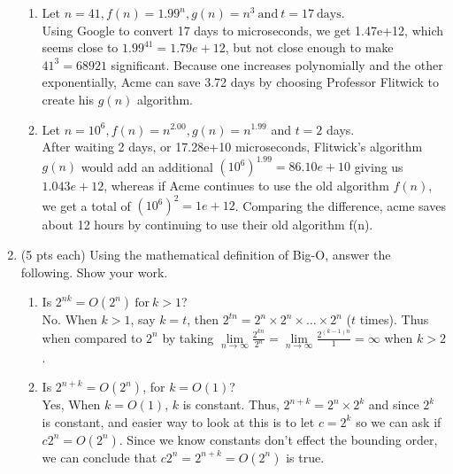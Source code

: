 \documentclass[11pt]{article}
\theoremstyle{definition}
\numberwithin{equation}{section}
\begin{document}
\begin{enumerate}
	\begin{enumerate}
		\item Let $n=41, f(n)=1.99^n, g(n)=n^3\ \text{and}\ t=17\ \text{days}$. \\
		Using Google to convert 17 days to microseconds, we get 1.47e+12, which seems close to $1.99^{41} = 1.79e+12$, but not close enough to make $41^3 = 68921$ significant. Because one increases polynomially and the other exponentially, Acme can save 3.72 days by choosing Professor Flitwick to create his $g(n)$ algorithm.\\
		
		\item Let $n=10^6, f(n)=n^{2.00}, g(n)=n^{1.99}$ and $t = 2$ days. \\
		After waiting 2 days, or 17.28e+10 microseconds, Flitwick's algorithm $g(n)$ would add an additional $(10^6)^1.99 = 86.10e+10$ giving us $1.043e+12$, whereas if Acme continues to use the old algorithm $f(n)$, we get a total of $(10^6)^2 = 1e+12$. Comparing the difference, acme saves about 12 hours by continuing to use their old algorithm f(n).
		
		
	\end{enumerate}
	
	\item (5 pts each) Using the mathematical definition of Big-O, answer the following. Show
your work. 
	
	\begin{enumerate}
		\item Is $2^{nk} = O(2^n)\ \text{for}\ k>1$? \\
		No. When $k>1$, say $k=t$, then $2^{tn} = 2^n \times 2^n \times \dots \times 2^n$ ($t$ times). Thus when compared to $2^n$ by taking $\lim\limits_{n \rightarrow \infty} \frac{2^{kn}}{2^n} = \lim\limits_{n \rightarrow \infty} \frac{2^{(k-1)n}}{1} = \infty$ when $k > 2$.  \\
		
		\item Is $2^{n + k} = O(2^n)$, for $k=O(1)$? \\
		Yes, When $k = O(1)$, $k$ is constant. Thus, $2^{n + k} = 2^n \times 2^k$ and since $2^k$ is constant, and easier way to look at this is to let $c = 2^k$ so we can ask if $c2^n = O(2^n)$. Since we know constants don't effect the bounding order, we can conclude that $c2^n = 2^{n+k} = O(2^n)$ is true.
	\end{enumerate}
	

\end{enumerate}
\end{document}
